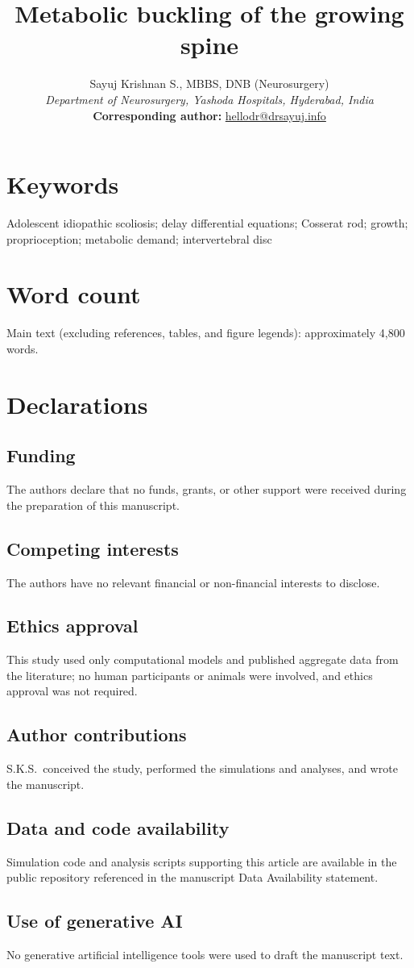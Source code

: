 \documentclass[11pt]{article}
\title{Metabolic buckling of the growing spine}
\author{Sayuj Krishnan S., MBBS, DNB (Neurosurgery) \\
\textit{Department of Neurosurgery, Yashoda Hospitals, Hyderabad, India} \\
\textbf{Corresponding author:} \href{mailto:hellodr@drsayuj.info}{hellodr@drsayuj.info}}
\date{}
\begin{document}
\maketitle

\section*{Keywords}
Adolescent idiopathic scoliosis; delay differential equations; Cosserat rod; growth; proprioception; metabolic demand; intervertebral disc

\section*{Word count}
Main text (excluding references, tables, and figure legends): approximately 4{,}800 words.

\section*{Declarations}

\subsection*{Funding}
The authors declare that no funds, grants, or other support were received during the preparation of this manuscript.

\subsection*{Competing interests}
The authors have no relevant financial or non-financial interests to disclose.

\subsection*{Ethics approval}
This study used only computational models and published aggregate data from the literature; no human participants or animals were involved, and ethics approval was not required.

\subsection*{Author contributions}
S.K.S.\ conceived the study, performed the simulations and analyses, and wrote the manuscript.

\subsection*{Data and code availability}
Simulation code and analysis scripts supporting this article are available in the public repository referenced in the manuscript Data Availability statement.

\subsection*{Use of generative AI}
No generative artificial intelligence tools were used to draft the manuscript text.
\end{document}
